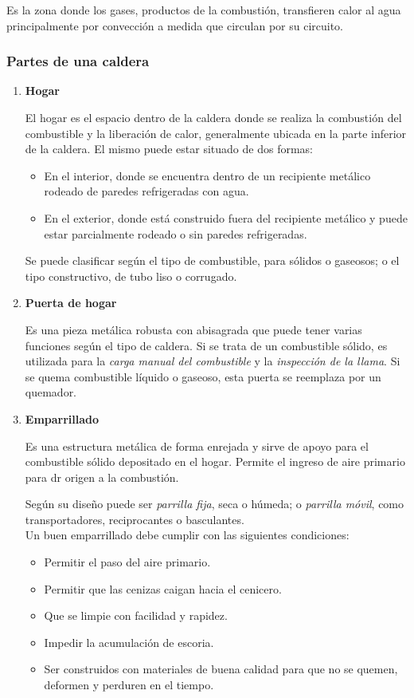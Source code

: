 
Es la zona donde los gases, productos de la combustión, transfieren calor al agua principalmente por convección a medida que circulan por su circuito.

\subsubsection{Partes de una caldera}

\begin{enumerate}
	\item \textbf{Hogar} 
	
	El hogar es el espacio dentro de la caldera donde se realiza la combustión del combustible y la liberación de calor, generalmente ubicada en la parte inferior de la caldera. El mismo puede estar situado de dos formas:
	\begin{itemize}
		\item En el interior, donde se encuentra dentro de un recipiente metálico rodeado de paredes refrigeradas con agua.
		\item En el exterior, donde está construido fuera del recipiente metálico y puede estar parcialmente rodeado o sin paredes refrigeradas.
	\end{itemize}
	
	Se puede clasificar según el tipo de combustible, para sólidos o gaseosos; o el tipo constructivo, de tubo liso o corrugado.
	\item \textbf{Puerta de hogar}
	
	Es una pieza metálica robusta con abisagrada que puede tener varias funciones según el tipo de caldera. Si se trata de un combustible sólido, es utilizada para la \textit{carga manual del combustible} y la \textit{inspección de la llama}. Si se quema combustible líquido o gaseoso, esta puerta se reemplaza por un quemador.
	
	\item \textbf{Emparrillado}
	
	Es una estructura metálica de forma enrejada y sirve de apoyo para el combustible sólido depositado en el hogar. Permite el ingreso de aire primario para dr origen a la combustión.
	
	
	Según su diseño puede ser \textit{parrilla fija}, seca o húmeda; o \textit{parrilla móvil}, como transportadores, reciprocantes o basculantes.\\
	
	Un buen emparrillado debe cumplir con las siguientes condiciones:
	\begin{itemize}
		\item Permitir el paso del aire primario.
		\item Permitir que las cenizas caigan hacia el cenicero.
		\item Que se limpie con facilidad y rapidez.
		\item Impedir la acumulación de escoria.
		\item Ser construidos con materiales de buena calidad para que no se quemen, deformen y perduren en el tiempo.
	\end{itemize}


\end{enumerate}
